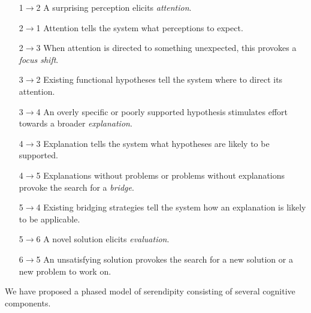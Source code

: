 \begin{itemize}
\item[1$\rightarrow$2] A surprising perception elicits \emph{attention}.
\item[2$\rightarrow$1] Attention tells the system what perceptions to expect.
\item[2$\rightarrow$3] When attention is directed to something unexpected, this provokes a \emph{focus shift}.
\item[3$\rightarrow$2] Existing functional hypotheses tell the system where to direct its attention.
\item[3$\rightarrow$4] An overly specific or poorly supported hypothesis stimulates effort towards a broader \emph{explanation}.
\item[4$\rightarrow$3] Explanation tells the system what hypotheses are likely to be supported.
\item[4$\rightarrow$5] Explanations without problems or problems without explanations provoke the search for a \emph{bridge}.
\item[5$\rightarrow$4] Existing bridging strategies tell the system how an explanation is likely to be applicable.
\item[5$\rightarrow$6] A novel solution elicits \emph{evaluation}.
\item[6$\rightarrow$5] An unsatisfying solution provokes the search for a new solution or a new problem to work on.
\end{itemize}


We have proposed a phased model of serendipity consisting of several
cognitive components.  %

